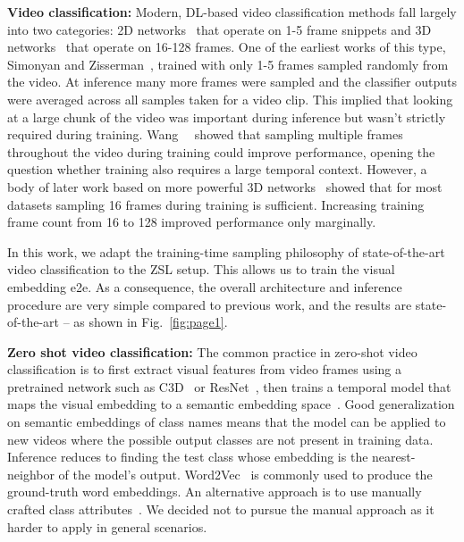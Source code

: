 \documentclass[10pt,twocolumn,letterpaper]{article}
\begin{document}
\textbf{Video classification:} Modern, DL-based video classification methods fall largely into two categories: 2D networks~\cite{twostream, tsn} that operate on 1-5 frame snippets and 3D networks~\cite{ourcvpr, oureccv, i3d, slowfast, r3d, action_finegrain, ourgcpr, c3d, r2plus1d} that operate on 16-128 frames. One of the earliest works of this type, Simonyan and Zisserman~\cite{twostream}, trained with only 1-5 frames sampled randomly from the video. At inference many more frames were sampled and the classifier outputs were averaged across all samples taken for a video clip. This implied that looking at a large chunk of the video was important during inference but wasn't strictly required during training. Wang~\etal~\cite{tsn} showed that sampling multiple frames throughout the video during training could improve performance, opening the question whether training also requires a large temporal context. However, a body of later work based on more powerful 3D networks~\cite{i3d, slowfast, c3d} showed that for most datasets sampling 16 frames during training is sufficient. Increasing training frame count from 16 to 128 improved performance only marginally.

In this work, we adapt the training-time sampling philosophy of state-of-the-art video classification to the ZSL setup. This allows us to train the visual embedding e2e. As a consequence, the overall architecture and inference procedure are very simple compared to previous work, and the results are state-of-the-art -- as shown in Fig.~\ref{fig:page1}.

\textbf{Zero shot video classification:}
The common practice in zero-shot video classification is to first extract visual features from video frames using a pretrained network such as C3D~\cite{c3d} or ResNet~\cite{resnet}, then trains a temporal model that maps the visual embedding to a semantic embedding space~\cite{tarn, chuang2016aaai, chuang2015aaai, chuang2016cvpr, chuang2016ijcv, action2vec, mettes2017, piergiovanni2018learning,zhang2018cross, uar}. Good generalization on semantic embeddings of class names means that the model can be applied to new videos where the possible output classes are not present in training data. Inference reduces to finding the test class whose embedding is the nearest-neighbor of the model's output. Word2Vec~\cite{word2vec} is commonly used to produce the ground-truth word embeddings. An alternative approach is to use manually crafted class attributes~\cite{idrees2017thumos}. We decided not to pursue the manual approach as it harder to apply in general scenarios.
\end{document}
